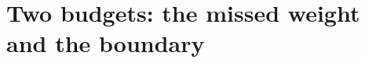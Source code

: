 %
%
%
%
%
%
%
%
%
%
%
%
%
%
%


\section{Two budgets: the missed weight and the boundary}
\label{sec:leakage}

